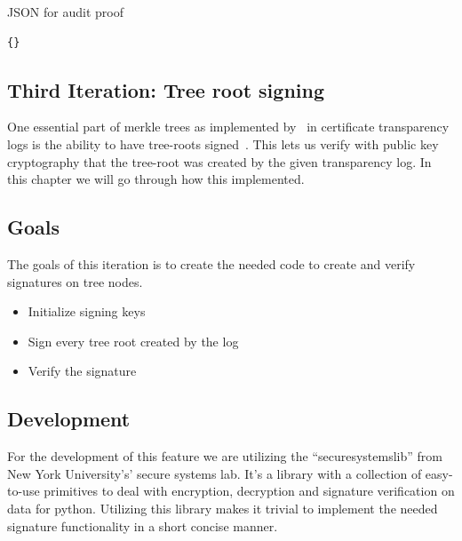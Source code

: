 \documentclass[../Main/thesis.tex]{subfiles}
\begin{document}
\begin{listing}[H]
\caption{JSON for audit proof}
\label{lst:audit proof}
\begin{verbatim}
{}
\end{verbatim}
\end{listing}


\subsection{Third Iteration: Tree root signing}%
\label{sub:tree_root_signing}
One essential part of merkle trees as implemented
by~\citeauthor{b.-laurie-a.-langley-e.kaster-google-2013} in certificate
transparency logs is the ability to have tree-roots
signed~\cite{b.-laurie-a.-langley-e.kaster-google-2013}. This lets us verify
with public key cryptography that the tree-root was created by the given
transparency log. In this chapter we will go through how this implemented.

\subsection*{Goals}%
\label{sub:third_iteration_goals}

The goals of this iteration is to create the needed code to create and verify
signatures on tree nodes.

\begin{itemize}
    \item Initialize signing keys
    \item Sign every tree root created by the log
    \item Verify the signature
\end{itemize}

\subsection*{Development}%
\label{sub:third_iteration_development}
For the development of this feature we are utilizing the ``securesystemslib'' from
New York University's' secure systems lab. It's a library with a collection of
easy-to-use primitives to deal with encryption, decryption and signature
verification on data for python. Utilizing this library makes it trivial to
implement the needed signature functionality in a short concise manner.
\end{document}

